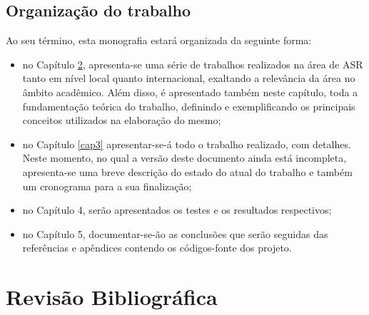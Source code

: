 \documentclass[a4paper,12pt,twoside,openright]{report}
\begin{document}
\section{Organiza\c{c}\~{a}o do trabalho}
\par Ao seu t\'{er}mino, esta monografia estar\'{a} organizada da seguinte forma:
\begin{itemize}
\item{}no Cap\'{i}tulo \ref{cap2}, apresenta-se uma s\'{e}rie de trabalhos realizados na \'{a}rea de ASR tanto em n\'{i}vel local quanto internacional, exaltando a relev\^{a}ncia da \'{a}rea no \^{a}mbito acad\^{e}mico. Al\'{e}m disso, \'{e} apresentado tamb\'{e}m neste cap\'{i}tulo, toda a fundamenta{\c c}\~{a}o te\'{o}rica do trabalho, definindo e exemplificando os principais conceitos utilizados na elabora{\c c}\~{a}o do mesmo;
\item{}no Cap\'{i}tulo \ref{cap3} apresentar-se-\'{a} todo o trabalho realizado, com detalhes. Neste momento, no qual a vers\~{a}o deste documento ainda est\'{a} incompleta, apresenta-se uma breve descri{\c c}\~{a}o do estado do atual do trabalho e tamb\'{e}m um cronograma para a sua finaliza{\c c}\~{a}o;
\item{}no Cap\'{i}tulo 4, ser\~{a}o apresentados os testes e os resultados respectivos;
\item{}no Cap\'{i}tulo 5, documentar-se-\~{a}o as conclus\~{o}es que ser\~{a}o seguidas das refer\^{e}ncias e ap\^{e}ndices contendo os c\'{o}digos-fonte dos projeto. 
\end{itemize}
\chapter{Revis\~{a}o Bibliogr\'{a}fica}
\label{cap2}
\thispagestyle{myheadings}
\end{document}
